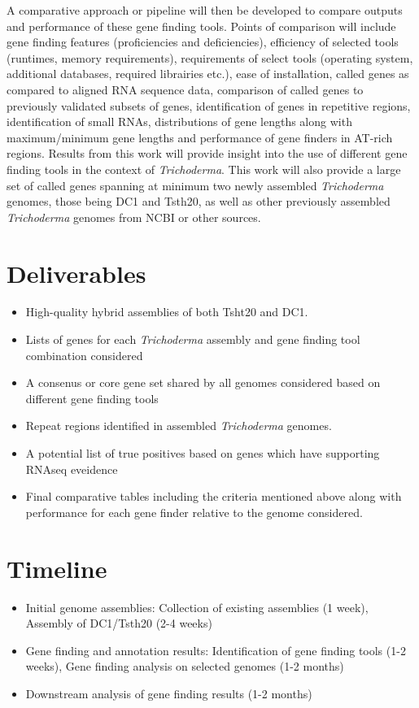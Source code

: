 \documentclass[12pt]{article}
\begin{document}
A comparative approach or pipeline will then be developed to compare
outputs and performance of these gene finding tools. Points of
comparison will include gene finding features (proficiencies and
deficiencies), efficiency of selected tools (runtimes, memory
requirements), requirements of select tools (operating system,
additional databases, required librairies etc.), ease of installation,
called genes as compared to aligned RNA sequence data, comparison of
called genes to previously validated subsets of
genes\cite{Validation}, identification of genes in repetitive regions,
identification of small RNAs, distributions of gene lengths along with
maximum/minimum gene lengths and performance of gene finders in
AT-rich regions. Results from this work will provide insight into the
use of different gene finding tools in the context of
\textit{Trichoderma}. This work will also provide a large set of
called genes spanning at minimum two newly assembled
\textit{Trichoderma} genomes, those being DC1 and Tsth20, as well as
other previously assembled \textit{Trichoderma} genomes from NCBI or
other sources.

\section{Deliverables}
\begin{itemize}
\item High-quality hybrid assemblies of both Tsht20 and DC1.
\item Lists of genes for each \textit{Trichoderma} assembly and gene
  finding tool combination considered
\item A consenus or core gene set shared by all genomes considered
  based on different gene finding tools
\item Repeat regions identified in assembled \textit{Trichoderma}
  genomes.
\item A potential list of true positives based on genes which have
  supporting RNAseq eveidence
\item Final comparative tables including the criteria mentioned above
  along with performance for each gene finder relative to the genome
  considered.
\end{itemize}

\section{Timeline}
\begin{itemize}
\item Initial genome assemblies: Collection of existing assemblies (1 week), Assembly of DC1/Tsth20 (2-4 weeks)
\item Gene finding and annotation results: Identification of gene finding tools (1-2 weeks), Gene finding analysis on selected genomes (1-2 months)
\item Downstream analysis of gene finding results (1-2 months)
\end{itemize}
\end{document}
